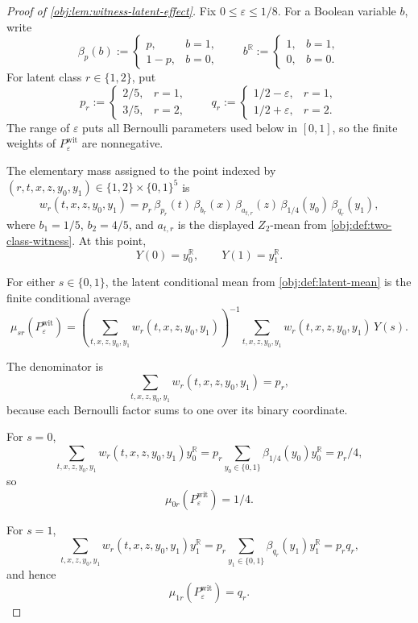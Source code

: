 \documentclass[11pt]{article}
\begin{document}
\begin{proof}[Proof of \cref{obj:lem:witness-latent-effect}]
Fix \(0\le\varepsilon\le 1/8\).  For a Boolean variable \(b\), write
\[
\beta_p(b):=
\begin{cases}
p, & b=1,\\
1-p, & b=0,
\end{cases}
\qquad
b^{\mathbb R}:=
\begin{cases}
1, & b=1,\\
0, & b=0.
\end{cases}
\]
For latent class \(r\in\{1,2\}\), put
\[
p_r:=
\begin{cases}
2/5, & r=1,\\
3/5, & r=2,
\end{cases}
\qquad
q_r:=
\begin{cases}
1/2-\varepsilon, & r=1,\\
1/2+\varepsilon, & r=2.
\end{cases}
\]
The range of \(\varepsilon\) puts all Bernoulli parameters used below in \([0,1]\), so the finite weights of \(P_{\varepsilon}^{\mathrm{wit}}\) are nonnegative. %

The elementary mass assigned to the point indexed by
\((r,t,x,z,y_0,y_1)\in\{1,2\}\times\{0,1\}^5\) is
\[
w_r(t,x,z,y_0,y_1)
=
p_r\,\beta_{p_r}(t)\,\beta_{b_r}(x)\,\beta_{a_{t,r}}(z)\,
\beta_{1/4}(y_0)\,\beta_{q_r}(y_1),
\]
where \(b_1=1/5\), \(b_2=4/5\), and \(a_{t,r}\) is the displayed \(Z_2\)-mean from \cref{obj:def:two-class-witness}.  At this point,
\[
Y(0)=y_0^{\mathbb R},
\qquad
Y(1)=y_1^{\mathbb R}.
\] %

For either \(s\in\{0,1\}\), the latent conditional mean from \cref{obj:def:latent-mean} is the finite conditional average
\[
\mu_{sr}(P_{\varepsilon}^{\mathrm{wit}})
=
\left(\sum_{t,x,z,y_0,y_1}w_r(t,x,z,y_0,y_1)\right)^{-1}
\sum_{t,x,z,y_0,y_1}
w_r(t,x,z,y_0,y_1)\,Y(s).
\] %

The denominator is
\[
\sum_{t,x,z,y_0,y_1}w_r(t,x,z,y_0,y_1)
=
p_r,
\]
because each Bernoulli factor sums to one over its binary coordinate. %

For \(s=0\),
\[
\sum_{t,x,z,y_0,y_1}
w_r(t,x,z,y_0,y_1)y_0^{\mathbb R}
=
p_r\sum_{y_0\in\{0,1\}}\beta_{1/4}(y_0)y_0^{\mathbb R}
=
p_r/4,
\]
so
\[
\mu_{0r}(P_{\varepsilon}^{\mathrm{wit}})=1/4.
\] %

For \(s=1\),
\[
\sum_{t,x,z,y_0,y_1}
w_r(t,x,z,y_0,y_1)y_1^{\mathbb R}
=
p_r\sum_{y_1\in\{0,1\}}\beta_{q_r}(y_1)y_1^{\mathbb R}
=
p_r q_r,
\]
and hence
\[
\mu_{1r}(P_{\varepsilon}^{\mathrm{wit}})=q_r.
\] %


\end{proof}
\end{document}
